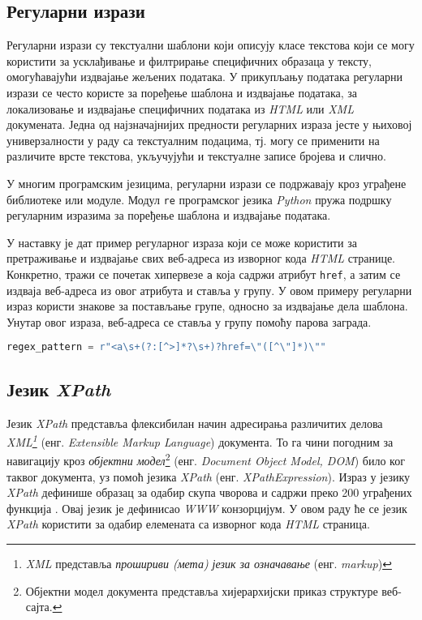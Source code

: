 \documentclass[12pt,oneside]{memoir}
\begin{document}
\subsection{Регуларни изрази}
Регуларни изрази су текстуални шаблони који описују класе текстова који се могу користити за усклађивање и филтрирање специфичних образаца у тексту, омогућавајући издвајање жељених података. У прикупљању података регуларни изрази се често користе за поређење шаблона и издвајање података, за локализовање и издвајање специфичних података из \textit{HTML} или \textit{XML} докумената. Једна од најзначајнијих предности регуларних израза јесте у њиховој универзалности у раду са текстуалним подацима, тј. могу се применити на различите врсте текстова, укључујући и текстуалне записе бројева и слично. 

У многим програмским језицима, регуларни изрази се подржавају кроз уграђене библиотеке или модуле. Модул \texttt{re} програмског језика \textit{Python} пружа подршку регуларним изразима за поређење шаблона и издвајање података.

У наставку је дат пример регуларног израза који се може користити за претраживање и издвајање свих веб-адреса из изворног кода \textit{HTML} странице. 
Конкретно, тражи се почетак хипервезе \texttt{a} која садржи атрибут \texttt{href}, а затим се издваја веб-адреса из овог атрибута и ставља у групу. У овом примеру регуларни израз користи знакове за постављање групе, односно за издвајање дела шаблона. Унутар овог израза, веб-адреса се ставља у групу помоћу парова заграда.
\begin{lstlisting}[language=Python]
regex_pattern = r"<a\s+(?:[^>]*?\s+)?href=\"([^\"]*)\""
\end{lstlisting}

\subsection{Језик \textit{XPath}}
Језик \textit{XPath} представља флексибилан начин адресирања различитих делова
\textit{XML\footnote{\textit{XML} представља \emph{прошириви (мета) језик за означавање} (енг. \textit{markup})}} (енг. \textit{Extensible Markup Language}) документа. То га чини погодним за навигацију кроз \emph{објектни модел}\footnote{Објектни модел документа представља хијерархијски приказ структуре веб-сајта.} (енг. \textit{Document Object Model, DOM}) било ког таквог документа, уз помоћ језика \emph{XPath} (енг. \textit{XPathExpression}). Израз у језику \textit{XPath} дефинише образац за одабир скупа чворова и садржи преко 200 уграђених функција \cite{xpath}. Овај језик је дефинисао \textit{WWW} конзорцијум. У овом раду ће се језик \textit{XPath} користити за одабир елемената са изворног кода \textit{HTML} страница.
\end{document}
